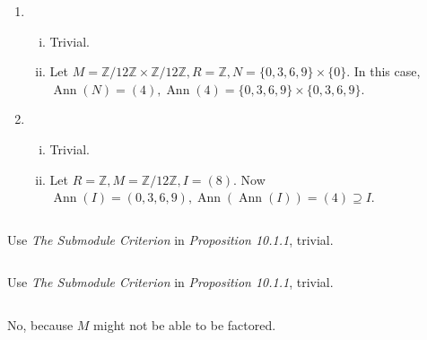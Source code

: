 \documentclass{article}
\newcommand{\tmdummy}{$\mbox{}$}
\newcommand{\tmem}[1]{{\em #1\/}}
\newcommand{\tmop}[1]{\ensuremath{\operatorname{#1}}}
\newenvironment{enumeratealpha}{\begin{enumerate}[a{\textup{)}}] }{\end{enumerate}}
\newenvironment{enumerateroman}{\begin{enumerate}[i.] }{\end{enumerate}}
\newenvironment{tmindent}{\begin{tmparmod}{1.5em}{0pt}{0pt}}{\end{tmparmod}}
\newenvironment{tmparmod}[3]{\begin{list}{}{\setlength{\topsep}{0pt}\setlength{\leftmargin}{#1}\setlength{\rightmargin}{#2}\setlength{\parindent}{#3}\setlength{\listparindent}{\parindent}\setlength{\itemindent}{\parindent}\setlength{\parsep}{\parskip}} \item[]}{\end{list}}
{\theorembodyfont{\rmfamily\small}\newtheorem{exercise}{Exercise}}
\begin{document}
\begin{exercise}
  {\tmdummy}
  
  \begin{enumeratealpha}
    \item
    \begin{enumerateroman}
      \item Trivial.
      
      \item Let $M = \mathbb{Z} / 12 \mathbb{Z} \times \mathbb{Z} / 12
      \mathbb{Z}, R = \mathbb{Z}, N = \{ 0, 3, 6, 9 \} \times \{ 0 \}$. In
      this case, $\tmop{Ann} (N) = (4), \tmop{Ann} (4) = \{ 0, 3, 6, 9 \}
      \times \{ 0, 3, 6, 9 \}$.
    \end{enumerateroman}
    \item
    \begin{enumerateroman}
      \item Trivial.
      
      \item Let $R = \mathbb{Z}, M = \mathbb{Z} / 12 \mathbb{Z}, I = (8)$. Now
      $\tmop{Ann} (I) = (0, 3, 6, 9), \tmop{Ann} (\tmop{Ann} (I)) = (4)
      \supseteq I$.
    \end{enumerateroman}
  \end{enumeratealpha}
\end{exercise}

\begin{exercise}
  {\tmdummy}
  
  \begin{tmindent}
    Use {\tmem{The Submodule Criterion}} in {\tmem{Proposition 10.1.1}},
    trivial.
  \end{tmindent}
\end{exercise}

\begin{exercise}
  {\tmdummy}
  
  \begin{tmindent}
    Use {\tmem{The Submodule Criterion}} in {\tmem{Proposition 10.1.1}},
    trivial.
  \end{tmindent}
\end{exercise}

\begin{exercise}
  {\tmdummy}
  
  \begin{tmindent}
    No, because $M$ might not be able to be factored.
  \end{tmindent}
\end{exercise}
\end{document}
